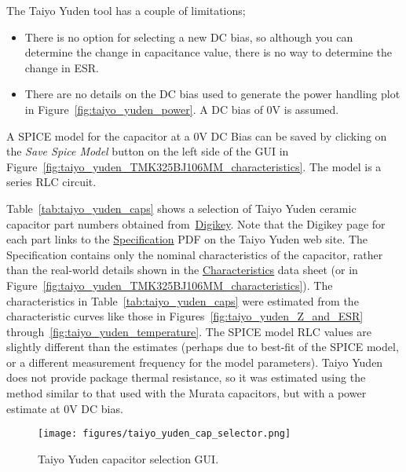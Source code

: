 \documentclass[10pt,twoside]{article}
\begin{document}
The Taiyo Yuden tool has a couple of limitations;
%
\begin{itemize}
\item 
There is no option for selecting a new DC bias, so although
you can determine the change in capacitance value, there is
no way to determine the change in ESR.
%
\item There are no details on the DC bias used to generate the
power handling plot in Figure~\ref{fig:taiyo_yuden_power}.
A DC bias of 0V is assumed.
%
\end{itemize}
%
A SPICE model for the capacitor at a 0V DC Bias can be saved
by clicking on the {\em Save Spice Model} button on the left
side of the GUI in
Figure~\ref{fig:taiyo_yuden_TMK325BJ106MM_characteristics}.
The model is a series RLC circuit.

Table~\ref{tab:taiyo_yuden_caps} shows a selection of Taiyo Yuden
ceramic capacitor part numbers obtained 
from~\href{http://www.digikey.com}{Digikey}.
Note that the Digikey page for each part links to the
\href{http://www.yuden.co.jp/ut/product/category/capacitor/TMK325BJ106MM-T.pdf}
{Specification} PDF on the Taiyo Yuden web site. The
Specification contains only the nominal characteristics of
the capacitor, rather than the real-world details shown in the 
\href{http://www.yuden.co.jp/productdata/sheet/tmk325bj106mm.pdf}
{Characteristics} data sheet (or in Figure~\ref{fig:taiyo_yuden_TMK325BJ106MM_characteristics}). 
%
The characteristics in Table~\ref{tab:taiyo_yuden_caps} were estimated
from the characteristic curves like those in 
Figures~\ref{fig:taiyo_yuden_Z_and_ESR} 
through~\ref{fig:taiyo_yuden_temperature}.
The SPICE model RLC values are slightly different than the estimates
(perhaps due to best-fit of the SPICE model, or a different 
measurement frequency for the model parameters).
Taiyo Yuden does not provide package thermal resistance, so it
was estimated using the method similar to that used with the
Murata capacitors, but with a power estimate at 0V DC bias.

%
\begin{landscape}
\begin{figure}[p]
  \begin{center}
    \texttt{[image: figures/taiyo\_yuden\_cap\_selector.png]}\\
  \end{center}
  \caption{Taiyo Yuden capacitor selection GUI.}
  \label{fig:taiyo_yuden_simsurfing_cap_selector}
\end{figure}
\end{landscape}
\end{document}
